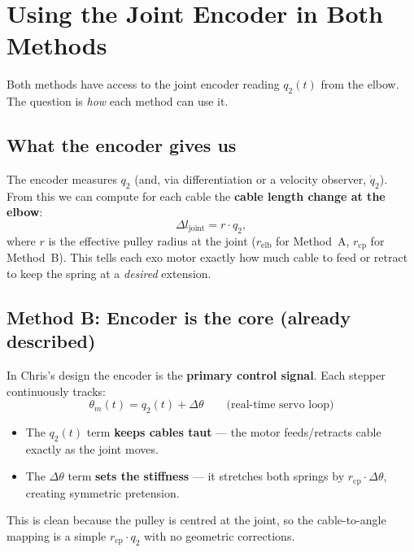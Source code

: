 \documentclass[11pt, a4paper]{article}
\begin{document}
\section{Using the Joint Encoder in Both Methods}
\label{sec:encoder}

Both methods have access to the joint encoder reading $q_2(t)$ from the
elbow.  The question is \emph{how} each method can use it.

\subsection{What the encoder gives us}

The encoder measures $q_2$ (and, via differentiation or a velocity observer,
$\dot{q}_2$).  From this we can compute for each cable the \textbf{cable
length change at the elbow}:
%
\begin{equation}\label{eq:encoder-cable}
    \Delta l_{\text{joint}} = r \cdot q_2,
\end{equation}
%
where $r$ is the effective pulley radius at the joint ($r_{\text{elb}}$ for
Method~A, $r_{\text{cp}}$ for Method~B).  This tells each exo motor
exactly how much cable to feed or retract to keep the spring at a
\emph{desired} extension.

\subsection{Method B: Encoder is the core (already described)}

In Chris's design the encoder is the \textbf{primary control signal}.  Each
stepper continuously tracks:
%
\begin{equation}
    \theta_{m}(t) = q_2(t) + \Delta\theta
    \qquad\text{(real-time servo loop)}
\end{equation}
%
\begin{itemize}
    \item The $q_2(t)$ term \textbf{keeps cables taut} --- the motor
        feeds/retracts cable exactly as the joint moves.
    \item The $\Delta\theta$ term \textbf{sets the stiffness} --- it
        stretches both springs by $r_{\text{cp}} \cdot \Delta\theta$,
        creating symmetric pretension.
\end{itemize}
This is clean because the pulley is centred at the joint, so the
cable-to-angle mapping is a simple $r_{\text{cp}} \cdot q_2$ with no
geometric corrections.
\end{document}
